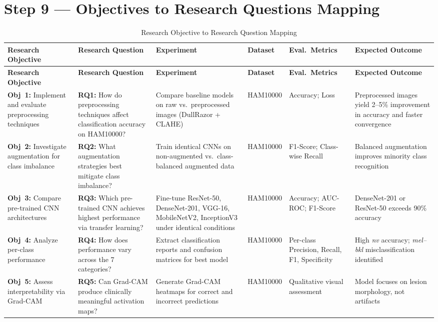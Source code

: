 \documentclass[11pt,a4paper]{article}
\begin{document}
\newpage

\section{Step 9 --- Objectives to Research Questions Mapping}
\label{sec:step9}

\begin{landscape}

{\small
\begin{longtable}{L{3.2cm} L{3.5cm} L{3.5cm} C{1.8cm} L{3cm} L{3.5cm}}
\caption{Research Objective to Research Question Mapping}\label{tab:rqmap}\\
\toprule
\textbf{Research Objective} & \textbf{Research Question} & \textbf{Experiment} & \textbf{Dataset} & \textbf{Eval.\ Metrics} & \textbf{Expected Outcome} \\
\midrule
\endfirsthead
\toprule
\textbf{Research Objective} & \textbf{Research Question} & \textbf{Experiment} & \textbf{Dataset} & \textbf{Eval.\ Metrics} & \textbf{Expected Outcome} \\
\midrule
\endhead
\bottomrule
\endlastfoot

\textbf{Obj~1:} Implement and evaluate preprocessing techniques & \textbf{RQ1:} How do preprocessing techniques affect classification accuracy on HAM10000? & Compare baseline models on raw vs.\ preprocessed images (DullRazor + CLAHE) & HAM10000 & Accuracy; Loss & Preprocessed images yield 2--5\% improvement in accuracy and faster convergence \\
\midrule
\textbf{Obj~2:} Investigate augmentation for class imbalance & \textbf{RQ2:} What augmentation strategies best mitigate class imbalance? & Train identical CNNs on non-augmented vs.\ class-balanced augmented data & HAM10000 & F1-Score; Class-wise Recall & Balanced augmentation improves minority class recognition \\
\midrule
\textbf{Obj~3:} Compare pre-trained CNN architectures & \textbf{RQ3:} Which pre-trained CNN achieves highest performance via transfer learning? & Fine-tune ResNet-50, DenseNet-201, VGG-16, MobileNetV2, InceptionV3 under identical conditions & HAM10000 & Accuracy; AUC-ROC; F1-Score & DenseNet-201 or ResNet-50 exceeds 90\% accuracy \\
\midrule
\textbf{Obj~4:} Analyze per-class performance & \textbf{RQ4:} How does performance vary across the 7 categories? & Extract classification reports and confusion matrices for best model & HAM10000 & Per-class Precision, Recall, F1, Specificity & High \textit{nv} accuracy; \textit{mel--bkl} misclassification identified \\
\midrule
\textbf{Obj~5:} Assess interpretability via Grad-CAM & \textbf{RQ5:} Can Grad-CAM produce clinically meaningful activation maps? & Generate Grad-CAM heatmaps for correct and incorrect predictions & HAM10000 & Qualitative visual assessment & Model focuses on lesion morphology, not artifacts \\


\end{longtable}}
\end{landscape}
\end{document}
